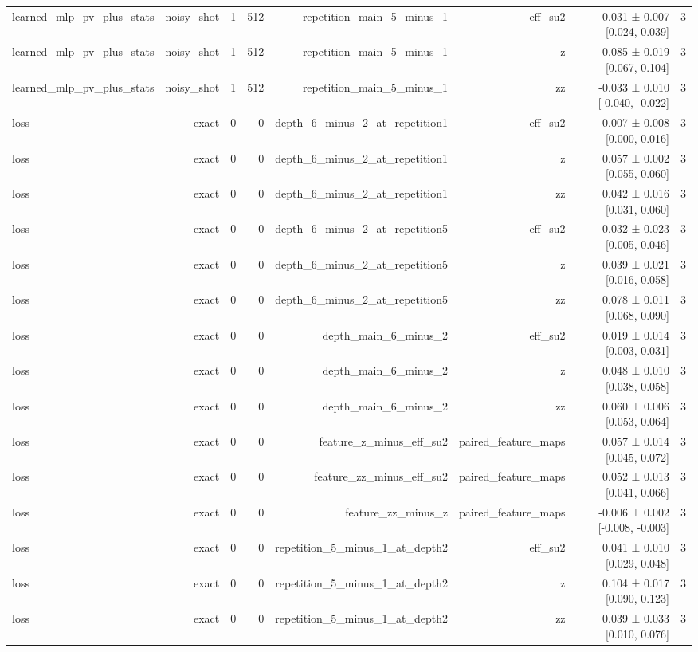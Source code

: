 \begin{table}
\begin{tabular}{lrrrrrrr}
learned\_mlp\_pv\_plus\_stats & noisy\_shot & 1 & 512 & repetition\_main\_5\_minus\_1 & eff\_su2 & 0.031 ± 0.007 [0.024, 0.039] & 3 \\
learned\_mlp\_pv\_plus\_stats & noisy\_shot & 1 & 512 & repetition\_main\_5\_minus\_1 & z & 0.085 ± 0.019 [0.067, 0.104] & 3 \\
learned\_mlp\_pv\_plus\_stats & noisy\_shot & 1 & 512 & repetition\_main\_5\_minus\_1 & zz & -0.033 ± 0.010 [-0.040, -0.022] & 3 \\
loss & exact & 0 & 0 & depth\_6\_minus\_2\_at\_repetition1 & eff\_su2 & 0.007 ± 0.008 [0.000, 0.016] & 3 \\
loss & exact & 0 & 0 & depth\_6\_minus\_2\_at\_repetition1 & z & 0.057 ± 0.002 [0.055, 0.060] & 3 \\
loss & exact & 0 & 0 & depth\_6\_minus\_2\_at\_repetition1 & zz & 0.042 ± 0.016 [0.031, 0.060] & 3 \\
loss & exact & 0 & 0 & depth\_6\_minus\_2\_at\_repetition5 & eff\_su2 & 0.032 ± 0.023 [0.005, 0.046] & 3 \\
loss & exact & 0 & 0 & depth\_6\_minus\_2\_at\_repetition5 & z & 0.039 ± 0.021 [0.016, 0.058] & 3 \\
loss & exact & 0 & 0 & depth\_6\_minus\_2\_at\_repetition5 & zz & 0.078 ± 0.011 [0.068, 0.090] & 3 \\
loss & exact & 0 & 0 & depth\_main\_6\_minus\_2 & eff\_su2 & 0.019 ± 0.014 [0.003, 0.031] & 3 \\
loss & exact & 0 & 0 & depth\_main\_6\_minus\_2 & z & 0.048 ± 0.010 [0.038, 0.058] & 3 \\
loss & exact & 0 & 0 & depth\_main\_6\_minus\_2 & zz & 0.060 ± 0.006 [0.053, 0.064] & 3 \\
loss & exact & 0 & 0 & feature\_z\_minus\_eff\_su2 & paired\_feature\_maps & 0.057 ± 0.014 [0.045, 0.072] & 3 \\
loss & exact & 0 & 0 & feature\_zz\_minus\_eff\_su2 & paired\_feature\_maps & 0.052 ± 0.013 [0.041, 0.066] & 3 \\
loss & exact & 0 & 0 & feature\_zz\_minus\_z & paired\_feature\_maps & -0.006 ± 0.002 [-0.008, -0.003] & 3 \\
loss & exact & 0 & 0 & repetition\_5\_minus\_1\_at\_depth2 & eff\_su2 & 0.041 ± 0.010 [0.029, 0.048] & 3 \\
loss & exact & 0 & 0 & repetition\_5\_minus\_1\_at\_depth2 & z & 0.104 ± 0.017 [0.090, 0.123] & 3 \\
loss & exact & 0 & 0 & repetition\_5\_minus\_1\_at\_depth2 & zz & 0.039 ± 0.033 [0.010, 0.076] & 3 \\

\end{tabular}
\end{table}
